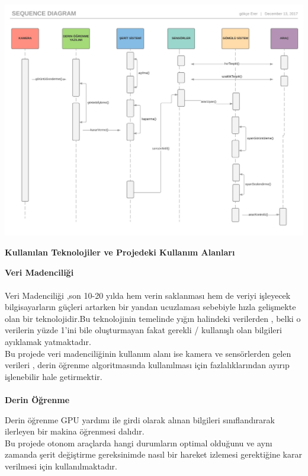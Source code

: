 \documentclass[12pt,a4paper]{report}
\begin{document}
\shorthandoff{=}
\includegraphics [width=\linewidth]{uml2.jpg}
\newpage
{\large\bfseries Kullanılan Teknolojiler ve Projedeki Kullanım Alanları\\ \par}

{\normalsize\bfseries Veri Madenciliği \\ \\}
Veri Madenciliği ,son 10-20 yılda hem verin saklanması hem de veriyi işleyecek bilgisayarların güçleri artarken bir yandan ucuzlaması sebebiyle hızla gelişmekte olan bir teknolojidir.Bu teknolojinin temelinde yığın halindeki verilerden , belki o verilerin yüzde 1’ini bile oluşturmayan fakat gerekli / kullanışlı olan bilgileri ayıklamak yatmaktadır. \\

Bu projede veri madenciliğinin kullanım alanı ise kamera ve sensörlerden gelen verileri , derin öğrenme algoritmasında kullanılması için fazlalıklarından ayırıp işlenebilir hale getirmektir. \\ \\

{\normalsize\bfseries Derin Öğrenme \\}

Derin öğrenme GPU yardımı ile girdi olarak alınan bilgileri sınıflandırarak ilerleyen bir makina öğrenmesi dalıdır.\\

Bu projede otonom araçlarda hangi durumların optimal olduğunu ve aynı zamanda şerit değiştirme gereksinimde nasıl bir hareket izlemesi gerektiğine karar verilmesi için kullanılmaktadır.\\
\end{document}
